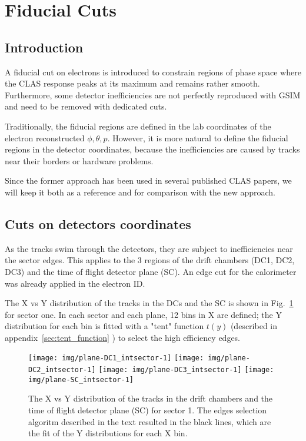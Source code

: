 \section{Fiducial Cuts}




\subsection{Introduction}

A fiducial cut on electrons is introduced to constrain regions of phase space
where the CLAS response peaks at its maximum and remains rather smooth.
Furthermore, some detector inefficiencies are not perfectly reproduced with GSIM and need to be
removed with dedicated cuts.

Traditionally, the fiducial regions are defined in the lab coordinates of the electron reconstructed $\phi, \theta, p$.
However, it is more natural to define the fiducial regions in the detector coordinates, because
the inefficiencies are caused by tracks near their borders or hardware problems.

Since the former approach has been used in several published CLAS papers, we will keep it both as a reference
and for comparison with the new approach.









\subsection{Cuts on detectors coordinates}

As the tracks swim through the detectors, they are subject to inefficiencies near the sector edges.
This applies to the 3 regions of the drift chambers (DC1, DC2, DC3) and the time of flight detector plane (SC).
An edge cut for the  calorimeter was already applied in the electron ID.

The X vs Y distribution of the tracks in the DCs and the SC is shown in Fig.~\ref{fig:xy_all_planes_s1} for
sector one.
In each sector and each plane, 12 bins in X are defined; the Y distribution for each bin
is fitted with a "tent" function $t(y)$ (described in appendix~\ref{sec:tent_function} ) to select the high efficiency edges.




\begin{figure}[ht]
    \centering
    \texttt{[image: img/plane-DC1\_intsector-1]}
    \texttt{[image: img/plane-DC2\_intsector-1]}
    \texttt{[image: img/plane-DC3\_intsector-1]}
    \texttt{[image: img/plane-SC\_intsector-1]}
    \caption{The X vs Y distribution of the tracks in the drift chambers and the time
    of flight detector plane (SC) for sector 1. The edges selection algoritm described in the text resulted
    in the black lines, which are the fit of the Y distributions for each X bin.}
    \label{fig:xy_all_planes_s1}
\end{figure}


